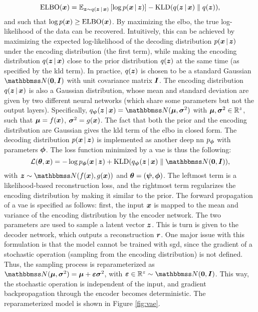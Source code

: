 $$\Fun{ELBO}(\Vector{x}) = \Expectation{\Vector{z} \sim q(\Vector{z} \given \Vector{x})}{\log p(\Vector{x} \given \Vector{z})} - \KLD{q(\Vector{z} \given \Vector{x})}{q(\Vector{z})},$$
and such that $\log p(\Vector{x}) \geq \Fun{ELBO}(\Vector{x})$. By maximizing the \gls{elbo}, the true log-likelihood of the data can be recovered. Intuitively, this can be achieved by maximizing the expected log-likelihood of the decoding distribution $p(\Vector{x} \given \Vector{z})$ under the encoding distribution (the first term), while making the encoding distribution $q(\Vector{z} \given \Vector{x})$ close to the prior distribution $q(\Vector{z})$ at the same time (as specified by the \gls{kld} term). In practice, $q(\Vector{z})$ is chosen to be a standard Gaussian $\Normal{\Zeros}{\Identity}$ with unit covariance matrix $\Identity$. The encoding distribution $q(\Vector{z} \given \Vector{x})$ is also a Gaussian distribution, whose mean and standard deviation are given by two different neural networks (which share some parameters but not the output layers). Specifically,
$\Encoder(\Vector{z} \given \Vector{x}) = \Normal{\MeanVec}{\StdVec}$ with $\boldsymbol{\mu},\boldsymbol{\sigma}^2 \in \mathbb{R}^z$, such that $\MeanVec = f(\Vector{x})$, $\StdVec = g(\Vector{x})$. The fact that both the prior and the encoding distribution are Gaussian gives the \gls{kld} term of the \gls{elbo} in closed form. The decoding distribution $p(\Vector{x} \given \Vector{z})$ is implemented as another deep \gls{nn} $p_{\boldsymbol{\phi}}$ with parameters $\boldsymbol{\phi}$. The loss function minimized by a \gls{vae} is thus the following:
$$\Loss(\Param, \Vector{x}) = - \log \Decoder(\Vector{x} \given \Vector{z}) + \KLD{\Encoder(\Vector{z} \given \Vector{x})}{\Normal{\Zeros}{\Identity}},$$
with $\Vector{z} \sim \Normal{f(\Vector{x})}{g(\Vector{x})}$ and $\boldsymbol{\theta} = (\boldsymbol{\psi},\boldsymbol{\phi})$. The leftmost term is a likelihood-based reconstruction loss, and the rightmost term regularizes the encoding distribution by making it similar to the prior. The forward propagation of a \gls{vae} is specified as follows: first, the input $\Vector{x}$ is mapped to the mean and variance of the encoding distribution by the encoder network. The two parameters are used to sample a latent vector $\Vector{z}$. This is turn is given to the decoder network, which outputs a reconstruction $\Vector{r}$. One major issue with this formulation is that the model cannot be trained with \gls{sgd}, since the gradient of a stochastic operation (sampling from the encoding distribution) is not defined. Thus, the sampling process is reparameterized as $\Normal{\MeanVec}{\StdVec} = \MeanVec + \boldsymbol{\eps}\StdVec$, with $\boldsymbol{\eps} \in \Real^z \sim \Normal{\Zeros}{\Identity}$. This way, the stochastic operation is independent of the input, and gradient backpropagation through the encoder becomes deterministic. The reparameterized model is shown in Figure \ref{fig:vae}.
